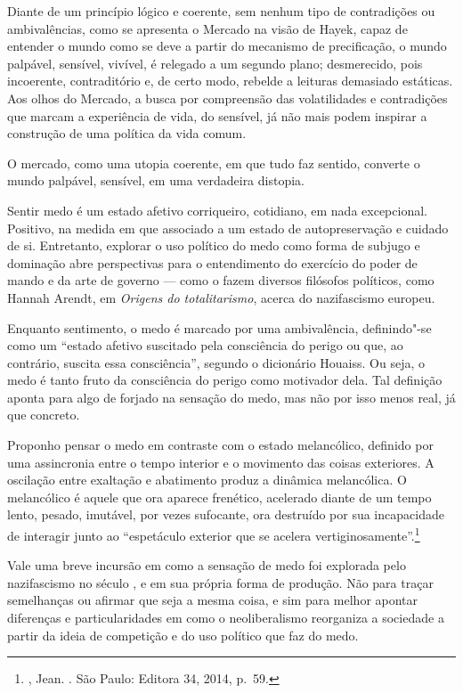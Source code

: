 Diante de um princípio lógico e coerente, sem nenhum tipo de
contradições ou ambivalências, como se apresenta o Mercado na visão de
Hayek, capaz de entender o mundo como se deve a partir do mecanismo de
precificação, o mundo palpável, sensível, vivível, é relegado a um
segundo plano; desmerecido, pois incoerente, contraditório e, de certo
modo, rebelde a leituras demasiado estáticas. Aos olhos do Mercado, a
busca por compreensão das volatilidades e contradições que marcam a
experiência de vida, do sensível, já não mais podem inspirar a
construção de uma política da vida comum.

O mercado, como uma utopia coerente, em que tudo faz sentido, converte o
mundo palpável, sensível, em uma verdadeira distopia.

\asterisc

Sentir medo é um estado afetivo corriqueiro, cotidiano, em nada
excepcional. Positivo, na medida em que associado a um estado de
autopreservação e cuidado de si. Entretanto, explorar o uso político do
medo como forma de subjugo e dominação abre perspectivas para o
entendimento do exercício do poder de mando e da arte de governo --- como o
fazem diversos filósofos políticos, como Hannah Arendt, em
\emph{Origens do totalitarismo}, acerca do nazifascismo europeu.

Enquanto sentimento, o medo é marcado por uma ambivalência,
definindo"-se como um ``estado afetivo suscitado pela consciência do
perigo ou que, ao contrário, suscita essa consciência'', segundo
o dicionário Houaiss. Ou seja, o medo é tanto fruto da
consciência do perigo como motivador dela. Tal definição aponta para
algo de forjado na sensação do medo, mas não por isso
menos real, já que concreto.

Proponho pensar o medo em contraste
com o estado melancólico, definido por uma
assincronia entre o tempo interior e o movimento das coisas exteriores.
A oscilação entre exaltação e abatimento produz a dinâmica melancólica.
O melancólico é aquele que ora aparece frenético, acelerado diante de um
tempo lento, pesado, imutável, por vezes sufocante, ora destruído por
sua incapacidade de interagir junto ao ``espetáculo exterior que se
acelera vertiginosamente''.\footnote{, Jean. {}. São Paulo: Editora 34, 2014, p.~59.}

Vale uma breve incursão em como a sensação de medo foi explorada pelo nazifascismo no século , e em sua própria forma de produção. Não para traçar semelhanças ou afirmar que seja a mesma coisa, e sim para melhor apontar diferenças e particularidades em como o neoliberalismo reorganiza a sociedade a partir da ideia de competição e do uso político que faz do medo.


